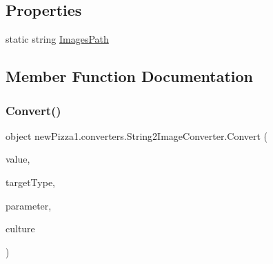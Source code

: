 \subsection*{Properties}
\begin{DoxyCompactItemize}
\item 
static string \hyperlink{classnewPizza1_1_1converters_1_1String2ImageConverter_a261c0f45c132518892027c163d88fe0a}{Images\+Path}
\end{DoxyCompactItemize}


\subsection{Member Function Documentation}
\mbox{\label{classnewPizza1_1_1converters_1_1String2ImageConverter_acdb25935515a4953373954bc2e61586d}} 
\subsubsection{\texorpdfstring{Convert()}{Convert()}}
{\footnotesize\ttfamily object new\+Pizza1.\+converters.\+String2\+Image\+Converter.\+Convert (\begin{DoxyParamCaption}\item[{object}]{value,  }\item[{Type}]{target\+Type,  }\item[{object}]{parameter,  }\item[{Culture\+Info}]{culture }\end{DoxyParamCaption})\hspace{0.3cm}{\ttfamily [inline]}}


